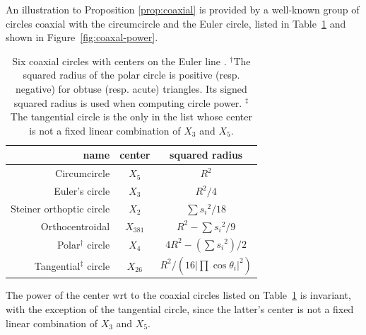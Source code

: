 An illustration to Proposition \ref{prop:coaxial} is provided by a well-known group of circles coaxial with the circumcircle and the Euler circle, listed in  Table~\ref{tab:coaxal-circles} and shown in Figure~\ref{fig:coaxal-power}.

\begin{table}
    \centering
    \begin{tabular}{|r|c|c|}
    \hline
    name & center & squared radius \\ \hline
        Circumcircle & $X_5$ & $R^2$ \\
        Euler's circle & $X_3$ & $R^2/4$ \\
        Steiner orthoptic circle & $X_2$ & ${\sum{s_i}^2}/18$ \\
        Orthocentroidal & $X_{381}$ & $R^2-\sum{s_i}^2/9$ \\
        Polar$^\dagger$ circle & $X_4$ & $4 R^2-(\sum{s_i}^2)/2$ \\
        Tangential$^\ddagger$ circle& $X_{26}$ & ${R^2}/({16|\prod{\cos\theta_i}|^2})$ \\
        \hline
    \end{tabular}
    \caption{Six coaxial circles with centers on the Euler line \cite[Coaxal System]{mw}. $^\dagger$The squared radius of the polar circle is positive (resp. negative) for obtuse (resp. acute) triangles. Its signed squared radius is used when computing circle power. $^\ddagger$The tangential circle is the only in the list whose center is not a fixed linear combination of $X_3$ and $X_5$.}
    \label{tab:coaxal-circles}
\end{table}

\begin{observation}
The power of the center wrt to the coaxial circles listed on Table~\ref{tab:coaxal-circles} is invariant, with the exception of the tangential circle, since the latter's center is not a fixed linear combination of $X_3$ and $X_5$.
\label{obs:coaxial}
\end{observation}

